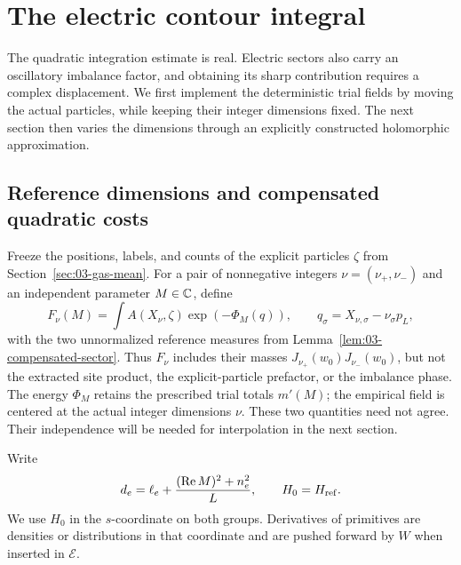 \section{The electric contour integral}\label{sec:04-gas-fluctuations}

The quadratic integration estimate is real. Electric sectors also carry
an oscillatory imbalance factor, and obtaining its sharp contribution
requires a complex displacement. We first implement the deterministic
trial fields by moving the actual particles, while keeping their integer
dimensions fixed. The next section then varies the dimensions through
an explicitly constructed holomorphic approximation.


\subsection{Reference dimensions and compensated quadratic costs}

Freeze the positions, labels, and counts of the explicit particles
\(\zeta\) from Section~\ref{sec:03-gas-mean}. For a pair of
nonnegative integers \(\nu=(\nu_+,\nu_-)\) and an independent
parameter \(M\in\mathbb C\), define
\[
 F_\nu(M)=\int A(X_\nu,\zeta)\exp(-\Phi_M(q)),
 \qquad q_\sigma=X_{\nu,\sigma}-\nu_\sigma p_L,
\]
with the two unnormalized reference measures from
Lemma~\ref{lem:03-compensated-sector}. Thus \(F_\nu\)
includes their masses \(J_{\nu_+}(w_0)J_{\nu_-}(w_0)\), but not
the extracted site product, the explicit-particle prefactor, or the
imbalance phase. The energy \(\Phi_M\) retains the prescribed
trial totals \(m'(M)\); the empirical field is centered at the
actual integer dimensions \(\nu\). These two quantities need not
agree. Their independence will be needed for interpolation in the
next section.

Write
\[
 d_e=\ell_e+\frac{(\operatorname{Re}M)^2+n_e^2}{L},
 \qquad H_0=H_{\rm ref}.
\]
We use \(H_0\) in the \(s\)-coordinate on both groups.
Derivatives of primitives are densities or distributions in that
coordinate and are pushed forward by \(W\) when inserted in
\(\mathcal E\).

